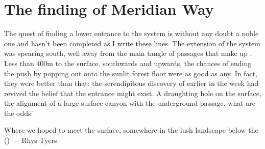 \section{The finding of Meridian Way} 
\begin{marginfigure}
\end{marginfigure}

The quest of finding a lower entrance to the system is without any doubt a noble one and hasn't been completed as I write these lines. The  extension of the system was spearing south, well away from the main tangle of passages that make up . Less than 400m to the surface, southwards and upwards, the chances of ending the push by popping out onto the sunlit forest floor were as good as any. In fact, they were better than that: the serendipitous discovery of  earlier in the week had revived the belief that the entrance might exist. A draughting hole on the surface, the alignment of a large surface canyon with the underground passage, what are the odds' 


\begin{pagefigure}
\checkoddpage \ifoddpage \forcerectofloat \else \forceversofloat \fi
\centering
{}
\caption{Where we hoped to meet the surface, somewhere in the lush landscape below the \protect{} (\protect{}) --- Rhys Tyers}
\label{planina na kalu}
\end{pagefigure}

